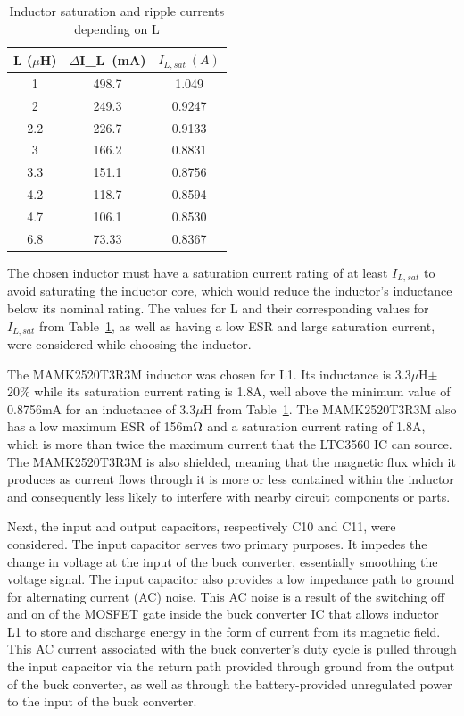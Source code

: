 \begin{table}[H]
\centering
\caption{Inductor saturation and ripple currents depending on L}
\label{tab:inductor_value}
\begin{tabular}{|c|c|c|}
\hline
L (${\mu}$H) & ${\Delta}$I_L~(mA) & $I_{L,sat}~(A)$ \\ \hline
1            & 498.7         & 1.049          \\ \hline
2            & 249.3         & 0.9247         \\ \hline
2.2          & 226.7         & 0.9133         \\ \hline
3            & 166.2         & 0.8831         \\ \hline
3.3          & 151.1         & 0.8756         \\ \hline
4.2          & 118.7         & 0.8594         \\ \hline
4.7          & 106.1         & 0.8530         \\ \hline
6.8          & 73.33         & 0.8367         \\ \hline
\end{tabular}
\end{table}

The chosen inductor must have a saturation current rating of at least $I_{L,sat}$ to avoid saturating the inductor core, which would reduce the inductor's inductance below its nominal rating. The values for L and their corresponding values for $I_{L,sat}$ from Table~\ref{tab:inductor_value}, as well as having a low ESR and large saturation current, were considered while choosing the inductor.

The MAMK2520T3R3M inductor was chosen for L1. Its inductance is 3.3$\mu$H$\pm$20\% while its saturation current rating is 1.8A, well above the minimum value of 0.8756mA for an inductance of 3.3$\mu$H from Table~\ref{tab:inductor_value}. The MAMK2520T3R3M also has a low maximum ESR of 156m$\ohm$ and a saturation current rating of 1.8A, which is more than twice the maximum current that the LTC3560 IC can source. The MAMK2520T3R3M is also shielded, meaning that the magnetic flux which it produces as current flows through it is more or less contained within the inductor and consequently less likely to interfere with nearby circuit components or parts.

Next, the input and output capacitors, respectively C10 and C11, were considered. The input capacitor serves two primary purposes. It impedes the change in voltage at the input of the buck converter, essentially smoothing the voltage signal. The input capacitor also provides a low impedance path to ground for alternating current (AC) noise. This AC noise is a result of the switching off and on of the MOSFET gate inside the buck converter IC that allows inductor L1 to store and discharge energy in the form of current from its magnetic field. This AC current associated with the buck converter's duty cycle is pulled through the input capacitor via the return path provided through ground from the output of the buck converter, as well as through the battery-provided unregulated power to the input of the buck converter.

